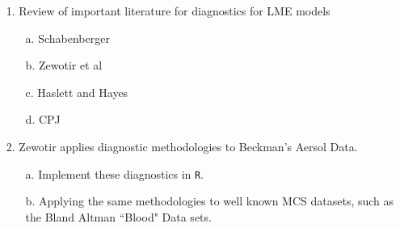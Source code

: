 \documentclass[a4paper,12pt]{article}
\begin{document}


\newpage
\begin{itemize}
\item[1.] Review of important literature for diagnostics for LME models


\begin{itemize}
\item[a.] Schabenberger

\item[b.] Zewotir et al

\item[c.] Haslett and Hayes

\item[d.] CPJ
\end{itemize}


\item[2.] Zewotir applies diagnostic methodologies to Beckman's Aersol Data.

\begin{itemize}
\item[a.] Implement these diagnostics in \texttt{R}.
\item[b.] Applying the same methodologies to well known MCS datasets, such as the Bland Altman ``Blood" Data sets.
\end{itemize}
\end{itemize}
\end{document}
